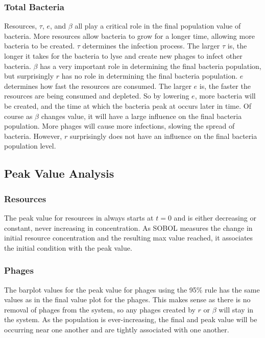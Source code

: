 \subsubsection{Total Bacteria}
Resources, $\tau$, $e$, and $\beta$ all play a critical role in the final population value of bacteria. 
More resources allow bacteria to grow for a longer time, allowing more bacteria to be created. 
$\tau$ determines the infection process. 
The larger $\tau$ is, the longer it takes for the bacteria to lyse and create new phages to infect other bacteria. 
$\beta$ has a very important role in determining the final bacteria population, but surprisingly $r$ has no role in determining the final bacteria population. 
$e$ determines how fast the resources are consumed. 
The larger $e$ is, the faster the resources are being consumed and depleted. 
So by lowering $e$, more bacteria will be created, and the time at which the bacteria peak at occurs later in time. 
Of course as $\beta$ changes value, it will have a large influence on the final bacteria population. 
More phages will cause more infections, slowing the spread of bacteria. 
However, $r$ surprisingly does not have an influence on the final bacteria population level. 


\subsection{Peak Value Analysis}
\subsubsection{Resources}
The peak value for resources in always starts at $t=0$ and is either decreasing or constant, never increasing in concentration. 
As SOBOL measures the change in initial resource concentration and the resulting max value reached, it associates the initial condition with the peak value. 

\subsubsection{Phages}
The barplot values for the peak value for phages using the 95\% rule has the same values as in the final value plot for the phages. 
This makes sense as there is no removal of phages from the system, so any phages created by $r$ or $\beta$ will stay in the system. 
As the population is ever-increasing, the final and peak value will be occurring near one another and are tightly associated with one another. 

